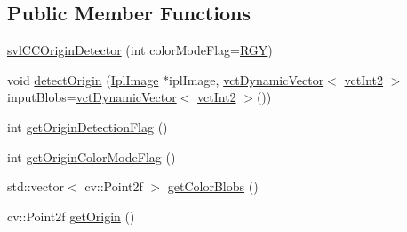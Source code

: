 \subsection*{Public Member Functions}
\begin{DoxyCompactItemize}
\item 
\hyperlink{classsvl_c_c_origin_detector_adf123af9eee12c51438f516cd884fa34}{svl\-C\-C\-Origin\-Detector} (int color\-Mode\-Flag=\hyperlink{classsvl_c_c_origin_detector_abc46027473187db71ca84294e3df9554a9cf1aba344d3244ebdbb4de099f3c181}{R\-G\-Y})
\item 
void \hyperlink{classsvl_c_c_origin_detector_a2b7715df60215e7dffe1dfafe9c055e5}{detect\-Origin} (\hyperlink{svl_types_8h_aa5a40a13021ba9708bfe921e18fdfa53}{Ipl\-Image} $\ast$ipl\-Image, \hyperlink{classvct_dynamic_vector}{vct\-Dynamic\-Vector}$<$ \hyperlink{vct_fixed_size_vector_types_8h_add8c88eb6a432b15f14b866b9c35325f}{vct\-Int2} $>$ input\-Blobs=\hyperlink{classvct_dynamic_vector}{vct\-Dynamic\-Vector}$<$ \hyperlink{vct_fixed_size_vector_types_8h_add8c88eb6a432b15f14b866b9c35325f}{vct\-Int2} $>$())
\item 
int \hyperlink{classsvl_c_c_origin_detector_a44a4e5f3804483c913f272bdff7e58e5}{get\-Origin\-Detection\-Flag} ()
\item 
int \hyperlink{classsvl_c_c_origin_detector_ad8df87bea63619953140d015634325b6}{get\-Origin\-Color\-Mode\-Flag} ()
\item 
std\-::vector$<$ cv\-::\-Point2f $>$ \hyperlink{classsvl_c_c_origin_detector_a332da38c8a61afd8a057ce4b0dba246c}{get\-Color\-Blobs} ()
\item 
cv\-::\-Point2f \hyperlink{classsvl_c_c_origin_detector_a5c8741c7f39db88ae235766458eb8607}{get\-Origin} ()
\end{DoxyCompactItemize}


